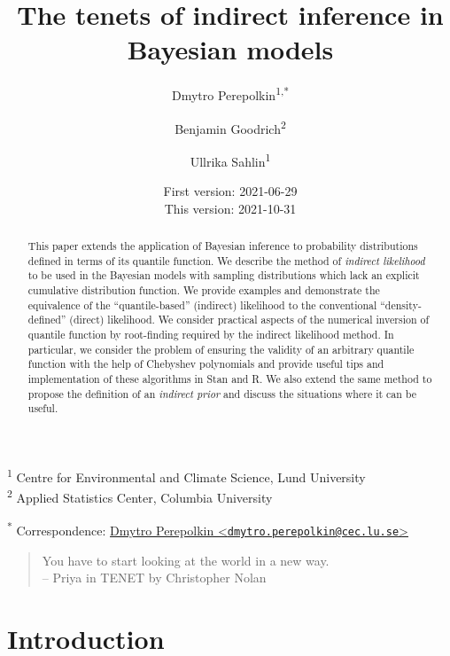 \documentclass[
  12pt,
]{article}
\title{\vspace{1cm}The tenets of indirect inference in Bayesian models\vspace{0.5cm}}
\author{Dmytro Perepolkin\textsuperscript{1,*} \and Benjamin Goodrich\textsuperscript{2} \and Ullrika Sahlin\textsuperscript{1}}
\date{First version: 2021-06-29\\
This version: 2021-10-31}
\begin{document}
\maketitle
\begin{abstract}
\noindent{}
This paper extends the application of Bayesian inference to probability distributions defined in terms of its quantile function. We describe the method of \emph{indirect likelihood} to be used in the Bayesian models with sampling distributions which lack an explicit cumulative distribution function. We provide examples and demonstrate the equivalence of the ``quantile-based'' (indirect) likelihood to the conventional ``density-defined'' (direct) likelihood. We consider practical aspects of the numerical inversion of quantile function by root-finding required by the indirect likelihood method. In particular, we consider the problem of ensuring the validity of an arbitrary quantile function with the help of Chebyshev polynomials and provide useful tips and implementation of these algorithms in Stan and R. We also extend the same method to propose the definition of an \emph{indirect prior} and discuss the situations where it can be useful. \vspace{.8cm}
\end{abstract}

\textsuperscript{1} Centre for Environmental and Climate Science, Lund University\\
\textsuperscript{2} Applied Statistics Center, Columbia University

\textsuperscript{*} Correspondence: \href{mailto:dmytro.perepolkin@cec.lu.se}{Dmytro Perepolkin \textless{}\href{mailto:dmytro.perepolkin@cec.lu.se}{\nolinkurl{dmytro.perepolkin@cec.lu.se}}\textgreater{}}

\setcounter{tocdepth}{4}
\tableofcontents
\renewcommand{\[}{\begin{equation}}
\renewcommand{\]}{\end{equation}}

\begin {quotation}
You have to start looking at the world in a new way.\\ 
-- Priya in TENET by Christopher Nolan 
\end{quotation}

\hypertarget{introduction}{%
\section{Introduction}\label{introduction}}
\end{document}
